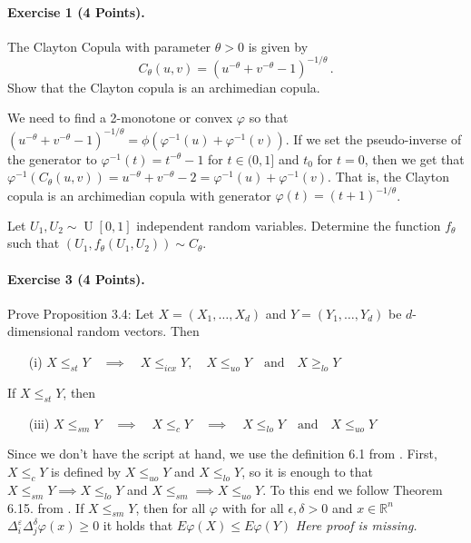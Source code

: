 \documentclass{article}
\begin{document}
\paragraph{Exercise 1 \textnormal{(4 Points)}.}
The Clayton Copula with parameter $\theta>0$ is given by
\[
C_\theta(u,v)=(u^{-\theta}+v^{-\theta}-1)^{-1/\theta}\,.
\]
Show that the Clayton copula is an archimedian copula.

We need to find a 2-monotone or convex $\varphi$ so that $(u^{-\theta}+v^{-\theta}-1)^{-1/\theta}=\phi(\varphi^{-1}(u)+\varphi^{-1}(v))$.
If we set the pseudo-inverse of the generator to $\varphi^{-1}(t)=t^{-\theta}-1$ for $t\in(0,1]$ and $t_0$ for $t=0$, then we get that $\varphi^{-1}(C_\theta(u,v))=u^{-\theta}+v^{-\theta}-2=\varphi^{-1}(u)+\varphi^{-1}(v)$.
That is, the Clayton copula is an archimedian copula with generator $\varphi(t)=(t+1)^{-1/\theta}$.

Let $U_1,U_2\sim\operatorname{U}[0,1]$ independent random variables.
Determine the function $f_\theta$ such that $(U_1,f_\theta(U_1,U_2))\sim C_\theta$.

\paragraph{Exercise 3 \textnormal{(4 Points)}.}
Prove Proposition 3.4:
Let $X=(X_1,\dots,X_d)$ and $Y=(Y_1,\dots,Y_d)$ be $d$-dimensional random vectors.
Then
\begin{itemize}
\item [(i)] $X\leq_{st} Y\quad\implies\quad X\leq_{icx}Y,\quad X\leq_{uo}Y\quad\text{and}\quad X\geq_{lo}Y$
\end{itemize}
If $X\leq_{st}Y$, then
\begin{itemize}
\item [(iii)] $X\leq_{sm}Y \quad\implies\quad X\leq_c Y\quad\implies\quad X\leq_{lo}Y\quad\text{and}\quad X\leq_{uo}Y$
\end{itemize}

Since we don't have the script at hand, we use the definition 6.1 from \cite{ruschendorf2013mathematical}.
First, $X\leq_c Y$ is defined by $X\leq_{uo}Y$ and $X\leq_{lo}Y$, so it is enough to that $X\leq_{sm}Y\implies X\leq_{lo}Y$ and $X\leq_{sm}\implies X\leq_{uo}Y$.
To this end we follow Theorem 6.15. from \cite{ruschendorf2013mathematical}.
If $X\leq_{sm}Y$, then for all $\varphi$ with for all $\epsilon,\delta>0$ and $x\in\mathbb{R}^n$ $\Delta^\varepsilon_i\Delta^\delta_j\varphi(x)\geq0$ it holds that $E\varphi(X)\leq E\varphi(Y)$
\emph{Here proof is missing.}
\end{document}
